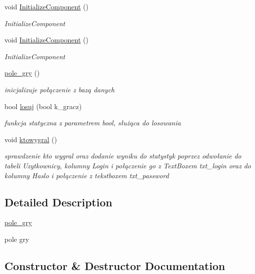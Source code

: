 \begin{DoxyCompactItemize}
void \mbox{\hyperlink{classprojekt_1_1pole__gry_acb91309f48624fdcd50a6f023a810f02}{Initialize\+Component}} ()
\begin{DoxyCompactList}\small\item\em Initialize\+Component \end{DoxyCompactList}\item 
void \mbox{\hyperlink{classprojekt_1_1pole__gry_acb91309f48624fdcd50a6f023a810f02}{Initialize\+Component}} ()
\begin{DoxyCompactList}\small\item\em Initialize\+Component \end{DoxyCompactList}\item 
\mbox{\hyperlink{classprojekt_1_1pole__gry_a5a66280013aef4e5a38ae1d0928d978a}{pole\+\_\+gry}} ()
\begin{DoxyCompactList}\small\item\em inicjalizuje połączenie z bazą danych \end{DoxyCompactList}\item 
bool \mbox{\hyperlink{classprojekt_1_1pole__gry_aeb3b718227f0dd6c91ed8dc97213b703}{losuj}} (bool k\+\_\+gracz)
\begin{DoxyCompactList}\small\item\em funkcja statyczna z parametrem bool, służąca do losowania \end{DoxyCompactList}\item 
void \mbox{\hyperlink{classprojekt_1_1pole__gry_a5de9e42bcabf05e113ae232dbffb793b}{ktowygral}} ()
\begin{DoxyCompactList}\small\item\em sprawdzenie kto wygral oraz dodanie wyniku do statystyk poprzez odwołanie do tabeli Uzytkownicy, kolumny Login i połączenie go z Text\+Boxem txt\+\_\+login oraz do kolumny Haslo i połączenie z tekstboxem txt\+\_\+password \end{DoxyCompactList}\end{DoxyCompactItemize}


\subsection{Detailed Description}
\mbox{\hyperlink{classprojekt_1_1pole__gry}{pole\+\_\+gry}} 

pole gry 

\subsection{Constructor \& Destructor Documentation}
\mbox{\label{classprojekt_1_1pole__gry_a5a66280013aef4e5a38ae1d0928d978a}} 
